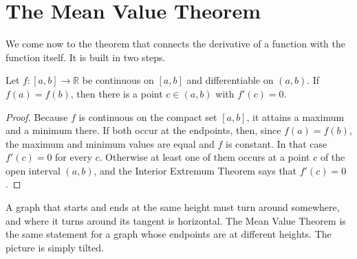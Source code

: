 \begin{marginfigure}
\centering
{}
\caption{The function $x^2 \sin(1/x)$ is trapped between the parabolas $x^2$ and $-x^2$, which forces it to flatten out at the origin.  Its slope, however, keeps swinging between about $-1$ and $1$ all the way in.  The picture shows the part of the graph very close to the origin.}
\end{marginfigure}

\section{The Mean Value Theorem}

We come now to the theorem that connects the derivative of a function with the function itself.  It is built in two steps.

\begin{theorem}\label{thm:rolle}
Let $f : [a,b] \to \mathbb{R}$ be continuous on $[a,b]$ and differentiable on $(a,b)$.  If $f(a) = f(b)$, then there is a point $c \in (a,b)$ with $f'(c) = 0$.
\end{theorem}

\begin{proof}
Because $f$ is continuous on the compact set $[a,b]$, it attains a maximum and a minimum there.  If both occur at the endpoints, then, since $f(a) = f(b)$, the maximum and minimum values are equal and $f$ is constant.  In that case $f'(c) = 0$ for every $c$.  Otherwise at least one of them occurs at a point $c$ of the open interval $(a,b)$, and the Interior Extremum Theorem says that $f'(c) = 0$.
\end{proof}

A graph that starts and ends at the same height must turn around somewhere, and where it turns around its tangent is horizontal.  The Mean Value Theorem is the same statement for a graph whose endpoints are at different heights.  The picture is simply tilted.

